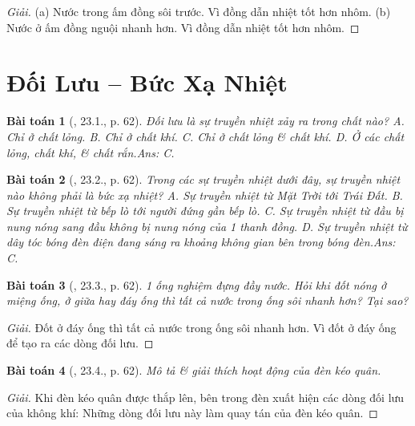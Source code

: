\documentclass{article}
\newtheorem{baitoan}{Bài toán}
\begin{document}
\begin{proof}[Giải]
	(a) Nước trong ấm đồng sôi trước. Vì đồng dẫn nhiệt tốt hơn nhôm. (b) Nước ở ấm đồng nguội nhanh hơn. Vì đồng dẫn nhiệt tốt hơn nhôm.
\end{proof}


\section{Đối Lưu -- Bức Xạ Nhiệt}

\begin{baitoan}[\cite{SBT_Vat_Ly_8}, 23.1., p. 62]
	Đối lưu là sự truyền nhiệt xảy ra trong chất nào? {\sf A.} Chỉ ở chất lỏng. {\sf B.} Chỉ ở chất khí. {\sf C.} Chỉ ở chất lỏng \& chất khí. {\sf D.} Ở các chất lỏng, chất khí, \& chất rắn.\hfill{\sf Ans: C.}
\end{baitoan}

\begin{baitoan}[\cite{SBT_Vat_Ly_8}, 23.2., p. 62]
	Trong các sự truyền nhiệt dưới đây, sự truyền nhiệt nào không phải là bức xạ nhiệt? {\sf A.} Sự truyền nhiệt từ Mặt Trời tới Trái Đất. {\sf B.} Sự truyền nhiệt từ bếp lò tới người đứng gần bếp lò. {\sf C.} Sự truyền nhiệt từ đầu bị nung nóng sang đầu không bị nung nóng của 1 thanh đồng. {\sf D.} Sự truyền nhiệt từ dây tóc bóng đèn điện đang sáng ra khoảng không gian bên trong bóng đèn.\hfill{\sf Ans: C.}
\end{baitoan}

\begin{baitoan}[\cite{SBT_Vat_Ly_8}, 23.3., p. 62]
	1 ống nghiệm đựng đầy nước. Hỏi khi đốt nóng ở miệng ống, ở giữa hay đáy ống thì tất cả nước trong ống sôi nhanh hơn? Tại sao?
\end{baitoan}

\begin{proof}[Giải]
	Đốt ở đáy ống thì tất cả nước trong ống sôi nhanh hơn. Vì đốt ở đáy ống để tạo ra các dòng đối lưu.
\end{proof}

\begin{baitoan}[\cite{SBT_Vat_Ly_8}, 23.4., p. 62]
	Mô tả \& giải thích hoạt động của đèn kéo quân.
\end{baitoan}

\begin{proof}[Giải]
	Khi đèn kéo quân được thắp lên, bên trong đèn xuất hiện các dòng đối lưu của không khí: Những dòng đối lưu này làm quay tán của đèn kéo quân.
\end{proof}
\end{document}
